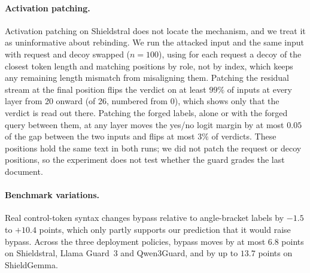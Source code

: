 \paragraph{Activation patching.}
Activation patching on Shieldstral does not locate the mechanism, and we treat it as uninformative about rebinding.
We run the attacked input and the same input with request and decoy swapped ($n=100$), using for each request a decoy of the closest token length and matching positions by role, not by index, which keeps any remaining length mismatch from misaligning them.
Patching the residual stream at the final position flips the verdict on at least $99\%$ of inputs at every layer from 20 onward (of 26, numbered from 0), which shows only that the verdict is read out there. %
Patching the forged labels, alone or with the forged query between them, at any layer moves the yes/no logit margin by at most $0.05$ of the gap between the two inputs and flips at most $3\%$ of verdicts. %
These positions hold the same text in both runs; we did not patch the request or decoy positions, so the experiment does not test whether the guard grades the last document. %

\paragraph{Benchmark variations.}
Real control-token syntax changes bypass relative to angle-bracket labels by $-1.5$ to $+10.4$ points, which only partly supports our prediction that it would raise bypass. %
Across the three deployment policies, bypass moves by at most $6.8$ points on Shieldstral, Llama Guard~3 and Qwen3Guard, and by up to $13.7$ points on ShieldGemma. %

